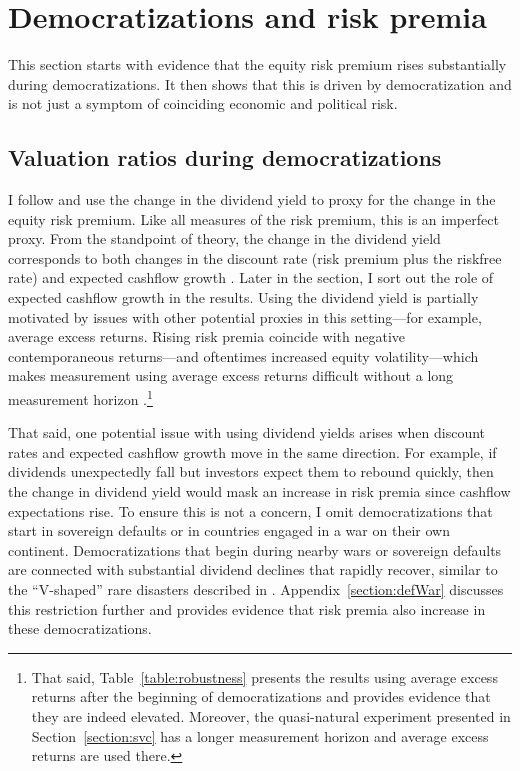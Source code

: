 \documentclass[12pt]{article}
\numberwithin{equation}{section}
\begin{document}
\section{Democratizations and risk premia}\label{section:facts}

This section starts with evidence that the equity risk premium rises substantially during democratizations. It then shows that this is driven by democratization and is not just a symptom of coinciding economic and political risk. 

\subsection{Valuation ratios during democratizations}\label{section:mainfact}

I follow \cite{Muir2017} and use the change in the dividend yield to proxy for the change in the equity risk premium. Like all measures of the risk premium, this is an imperfect proxy.  From the standpoint of theory, the change in the dividend yield corresponds to both changes in the discount rate (risk premium plus the riskfree rate) and expected cashflow growth \citep{Gordon1959,Campbell1988,Fama1988}.  Later in the section, I sort out the role of expected cashflow growth in the results. Using the dividend yield is partially motivated by issues with other potential proxies in this setting---for example, average excess returns.  Rising risk premia coincide with negative contemporaneous returns---and oftentimes increased equity volatility---which makes measurement using average excess returns difficult without a long measurement horizon \citep{Merton1980}.\footnote{That said, Table~\ref{table:robustness} presents the results using average excess returns after the beginning of democratizations and provides evidence that they are indeed elevated. Moreover, the quasi-natural experiment presented in Section~\ref{section:svc} has a longer measurement horizon and average excess returns are used there.}

\label{par:democratization_wars}
That said, one potential issue with using dividend yields arises when discount rates and expected cashflow growth move in the same direction. For example,  if dividends unexpectedly fall but investors expect them to rebound quickly, then the change in dividend yield would mask an increase in risk premia since cashflow expectations rise.  To ensure this is not a concern, I omit democratizations that start in sovereign defaults or in countries engaged in a war on their own continent.  Democratizations that begin during nearby wars or sovereign defaults are connected with substantial dividend declines that rapidly recover, similar to the ``V-shaped'' rare disasters described in \cite*{Barro2013}. Appendix~\ref{section:defWar} discusses this restriction further and provides evidence that risk premia also increase in these democratizations. 
\end{document}
